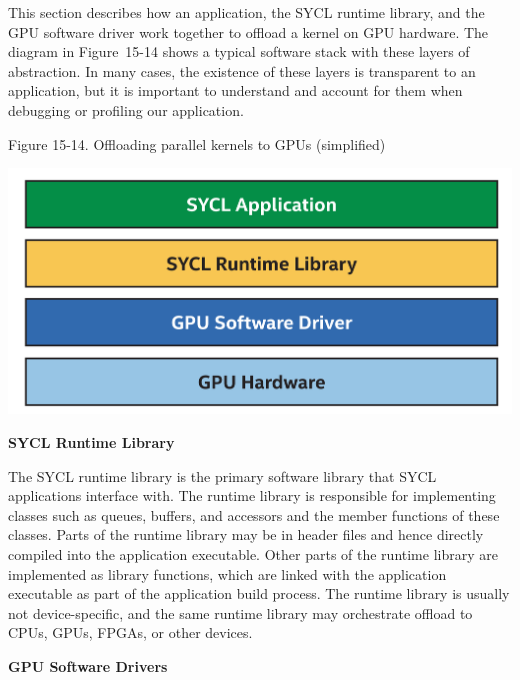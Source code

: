 This section describes how an application, the SYCL runtime library, and the GPU software driver work together to offload a kernel on GPU hardware. The diagram in Figure 15-14 shows a typical software stack with these layers of abstraction. In many cases, the existence of these layers is transparent to an application, but it is important to understand and account for them when debugging or profiling our application.\par

\hspace*{\fill} \par %
Figure 15-14. Offloading parallel kernels to GPUs (simplified)
\begin{center}
	\includegraphics[width=1.0\textwidth]{content/chapter-15/images/10}
\end{center}

\hspace*{\fill} \par %
\textbf{SYCL Runtime Library}

The SYCL runtime library is the primary software library that SYCL applications interface with. The runtime library is responsible for implementing classes such as queues, buffers, and accessors and the member functions of these classes. Parts of the runtime library may be in header files and hence directly compiled into the application executable. Other parts of the runtime library are implemented as library functions, which are linked with the application executable as part of the application build process. The runtime library is usually not device-specific, and the same runtime library may orchestrate offload to CPUs, GPUs, FPGAs, or other devices.\par

\hspace*{\fill} \par %
\textbf{GPU Software Drivers}

